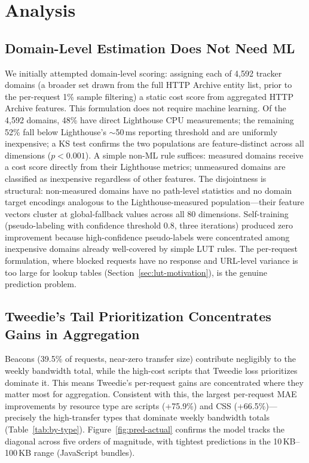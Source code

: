 \documentclass[sigconf,nonacm]{acmart}
\begin{document}
\section{Analysis}
\label{sec:analysis}

\subsection{Domain-Level Estimation Does Not Need ML}
\label{sec:domain-level}

We initially attempted domain-level scoring: assigning each of 4,592 tracker domains (a broader set drawn from the full HTTP Archive entity list, prior to the per-request 1\% sample filtering) a static cost score from aggregated HTTP Archive features.
This formulation does not require machine learning.
Of the 4,592 domains, 48\% have direct Lighthouse CPU measurements; the remaining 52\% fall below Lighthouse's $\sim$50\,ms reporting threshold and are uniformly inexpensive; a KS test confirms the two populations are feature-distinct across all dimensions ($p < 0.001$).
A simple non-ML rule suffices: measured domains receive a cost score directly from their Lighthouse metrics; unmeasured domains are classified as inexpensive regardless of other features.
The disjointness is structural: non-measured domains have no path-level statistics and no domain target encodings analogous to the Lighthouse-measured population---their feature vectors cluster at global-fallback values across all 80 dimensions.
Self-training~\cite{yarowsky1995unsupervised} (pseudo-labeling with confidence threshold 0.8, three iterations) produced zero improvement because high-confidence pseudo-labels were concentrated among inexpensive domains already well-covered by simple LUT rules.
The per-request formulation, where blocked requests have no response and URL-level variance is too large for lookup tables (Section~\ref{sec:lut-motivation}), is the genuine prediction problem.

\subsection{Tweedie's Tail Prioritization Concentrates Gains in Aggregation}

Beacons (39.5\% of requests, near-zero transfer size) contribute negligibly to the weekly bandwidth total, while the high-cost scripts that Tweedie loss prioritizes dominate it.
This means Tweedie's per-request gains are concentrated where they matter most for aggregation.
Consistent with this, the largest per-request MAE improvements by resource type are scripts (+75.9\%) and CSS (+66.5\%)---precisely the high-transfer types that dominate weekly bandwidth totals (Table~\ref{tab:by-type}).
Figure~\ref{fig:pred-actual} confirms the model tracks the diagonal across five orders of magnitude, with tightest predictions in the 10\,KB--100\,KB range (JavaScript bundles).
\end{document}
